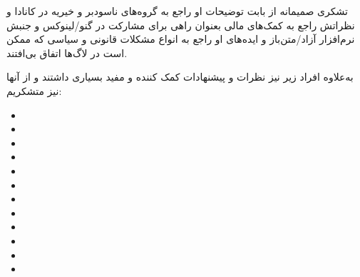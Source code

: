 تشکری صمیمانه از
بابت توضیحات او راجع به گروه‌های ناسودبر و خیریه در کانادا و نظراتش راجع به کمک‌های مالی بعنوان
راهی برای مشارکت در گنو/لینوکس و جنبش نرم‌افزار آزاد/متن‌باز و ایده‌های او راجع به انواع مشکلات قانونی
و سیاسی که ممکن است در لاگ‌ها اتفاق بی‌افتند.

به‌علاوه افراد زیر نیز نظرات و پیشنهادات کمک کننده و مفید بسیاری داشتند و از آنها نیز متشکریم:

\begin{itemize}
\item {}
\item {}
\item {}
\item {}
\item {}
\item {}
\item {}
\item {}
\item {}
\item {}
\item {}
\item {}
\end{itemize}

